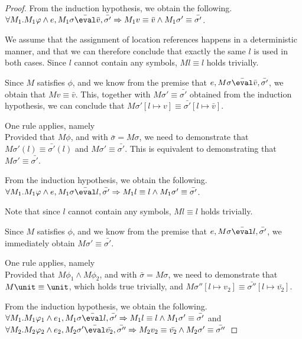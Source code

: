 \begin{proof}
{  From the induction hypothesis, we obtain the following.\\
  $\forall M_1 .  M_1\phi \wedge e, M_1\sigma \bar{\eval}\bar{v},\bar{\sigma'}\implies  M_1v\equiv \bar{v} \wedge  M_1\sigma'\equiv\bar{\sigma'}$.

  We assume that the assignment of location references happens in a deterministic manner, and that we can therefore conclude that exactly the same $l$ is used in both cases. Since $l$ cannot contain any symbols, $M l \equiv l$ holds trivially.

  Since $M$ satisfies $\phi$,
  and we know from the premise that $e,M\sigma \bar{\eval}\bar{v},\bar{\sigma'}$,
  we obtain that $M v\equiv \bar{v}$.
  This, together with $M \sigma' \equiv\bar{\sigma'}$ obtained from the induction hypothesis, we can conclude that $M\sigma'[l\mapsto v]\equiv\bar{\sigma'}[l\mapsto\bar{v}]$.
  }

  {One rule applies, namely \\
  Provided that $M\phi$, and  with $\bar{\sigma}=M\sigma$,
  we need to demonstrate that $M \sigma'(l) \equiv \bar{\sigma'}(l)$ and $M\sigma'\equiv\bar{\sigma'}$.
  This is equivalent to demonstrating that $M\sigma'\equiv\bar{\sigma'}$.

  From the induction hypothesis, we obtain the following.\\
  $\forall M_1 .  M_1\phi \wedge e, M_1\sigma \bar{\eval}l,\bar{\sigma'}\implies  M_1l\equiv l \wedge  M_1\sigma'\equiv\bar{\sigma'}$.

  Note that since $l$ cannot contain any symbols, $M l \equiv l$ holds trivially.

  Since $M$ satisfies $\phi$,
  and we know from the premise that $e,M\sigma \bar{\eval}l,\bar{\sigma'}$,
  we immediately obtain $M\sigma'\equiv\bar{\sigma'}$.
}

  {
  One rule applies, namely \\
  Provided that $M\phi_1\wedge M\phi_2$, and  with $\bar{\sigma}=M\sigma$,
  we need to demonstrate that $M\unit \equiv \unit$, which holds true trivially,
  and $M\sigma''[l\mapsto v_2]\equiv\bar{\sigma''}[l\mapsto\bar{v_2}]$.

  From the induction hypothesis, we obtain the following.\\
  $\forall M_1 .  M_1\phi_1 \wedge e_1, M_1\sigma \bar{\eval}l,\bar{\sigma'}\implies  M_1 l\equiv l \wedge  M_1\sigma'\equiv\bar{\sigma'}$ and\\
  $\forall M_2 . M_2\phi_2 \wedge e_2,M_2\sigma' \bar{\eval}\bar{v_2},\bar{\sigma''}\implies M_2v_2\equiv \bar{v_2} \wedge M_2\sigma'\equiv\bar{\sigma''}$

}
\end{proof}
